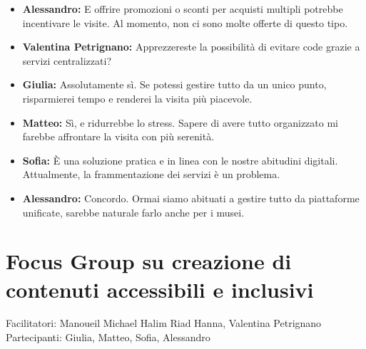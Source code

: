 \documentclass{article}
\begin{document}
\begin{itemize}
\item \textbf{Alessandro:} E offrire promozioni o sconti per acquisti multipli potrebbe incentivare le visite. Al momento, non ci sono molte offerte di questo tipo.

\item \textbf{Valentina Petrignano:} Apprezzereste la possibilità di evitare code grazie a servizi centralizzati?

\item \textbf{Giulia:} Assolutamente sì. Se potessi gestire tutto da un unico punto, risparmierei tempo e renderei la visita più piacevole.

\item \textbf{Matteo:} Sì, e ridurrebbe lo stress. Sapere di avere tutto organizzato mi farebbe affrontare la visita con più serenità.

\item \textbf{Sofia:} È una soluzione pratica e in linea con le nostre abitudini digitali. Attualmente, la frammentazione dei servizi è un problema.

\item \textbf{Alessandro:} Concordo. Ormai siamo abituati a gestire tutto da piattaforme unificate, sarebbe naturale farlo anche per i musei.

\end{itemize}

\section{Focus Group su creazione di contenuti accessibili e inclusivi} 
Facilitatori: Manoueil Michael Halim Riad Hanna, Valentina Petrignano \\
Partecipanti: Giulia, Matteo, Sofia, Alessandro
\end{document}
